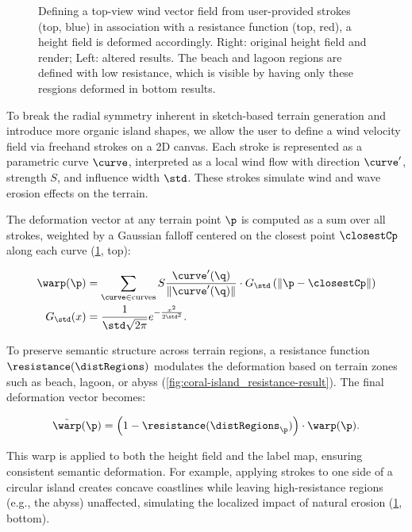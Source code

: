 \documentclass{egpubl}
\begin{document}
\begin{figure}
    \caption{Defining a top-view wind vector field from user-provided strokes (top, blue) in association with a resistance function (top, red), a height field is deformed accordingly. Right: original height field and render; Left: altered results. The beach and lagoon regions are defined with low resistance, which is visible by having only these resgions deformed in bottom results. }
    \label{fig:coral-island_wind-effect-result}
\end{figure}

To break the radial symmetry inherent in sketch-based terrain generation and introduce more organic island shapes, we allow the user to define a wind velocity field via freehand strokes on a 2D canvas. Each stroke is represented as a parametric curve $\curve$, interpreted as a local wind flow with direction $\curve'$, strength $S$, and influence width $\std$. These strokes simulate wind and wave erosion effects on the terrain.

The deformation vector at any terrain point $\p$ is computed as a sum over all strokes, weighted by a Gaussian falloff centered on the closest point $\closestCp$ along each curve (\cref{fig:coral-island_wind-effect-result}, top):

\begin{align}
    \warp(\p) &= \sum_{\curve \in \text{curves}} S \frac{\curve'(\q)}{\| \curve'(\q) \| } \cdot G_\std\left(\| \p - \closestCp \| \right) \\
    G_\std(x) &= \frac{1}{\std \sqrt{2\pi}} e^{-\frac{x^2}{2 \std^2}}.
\end{align}

To preserve semantic structure across terrain regions, a resistance function $\resistance(\distRegions)$ modulates the deformation based on terrain zones such as beach, lagoon, or abyss (\cref{fig:coral-island_resistance-result}). The final deformation vector becomes:

\begin{align}
    \Tilde{\warp}(\p) = \left(1 - \resistance(\distRegions_\p) \right) \cdot \warp(\p).
\end{align}

This warp is applied to both the height field and the label map, ensuring consistent semantic deformation. For example, applying strokes to one side of a circular island creates concave coastlines while leaving high-resistance regions (e.g., the abyss) unaffected, simulating the localized impact of natural erosion (\cref{fig:coral-island_wind-effect-result}, bottom).
\end{document}
